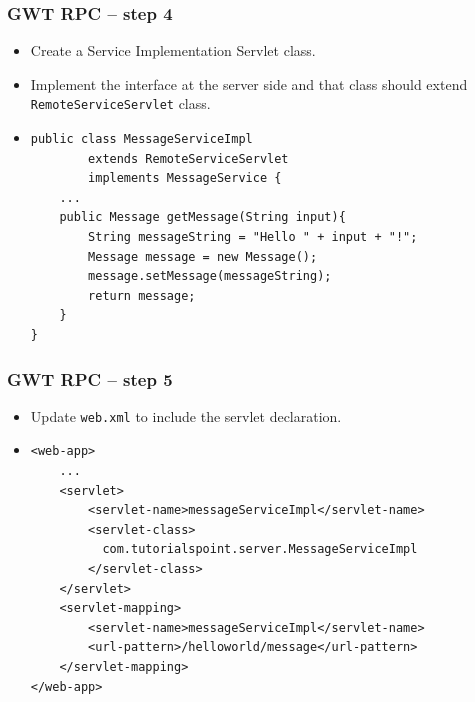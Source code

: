 \documentclass[10pt,table, xcolor=pdflatex]{beamer}
\begin{document}
\begin{frame}[fragile]\frametitle{GWT RPC -- step 4}
	\begin{itemize}
		\item Create a Service Implementation Servlet class.
		\item Implement the interface at the server side and that class should extend \texttt{RemoteServiceServlet} class.
        \item[]
        	\lstset{language=Java, basicstyle=\footnotesize\ttfamily}
			\begin{lstlisting}
public class MessageServiceImpl 
        extends RemoteServiceServlet
        implements MessageService {
    ...
    public Message getMessage(String input){
        String messageString = "Hello " + input + "!";
        Message message = new Message();
        message.setMessage(messageString);
        return message;
    }
}
			\end{lstlisting}
	\end{itemize}
\end{frame}


\begin{frame}[fragile]\frametitle{GWT RPC -- step 5}
	\begin{itemize}
		\item Update \texttt{web.xml} to include the servlet declaration.
        \medskip
		\item[]
        	\lstset{language=XML, basicstyle=\footnotesize\ttfamily}
			\begin{lstlisting}
<web-app>
    ...
    <servlet>
        <servlet-name>messageServiceImpl</servlet-name>
        <servlet-class>
          com.tutorialspoint.server.MessageServiceImpl
        </servlet-class>
    </servlet>
    <servlet-mapping>
        <servlet-name>messageServiceImpl</servlet-name>
        <url-pattern>/helloworld/message</url-pattern>
    </servlet-mapping>
</web-app>
			\end{lstlisting}
	\end{itemize}
\end{frame}
\end{document}
